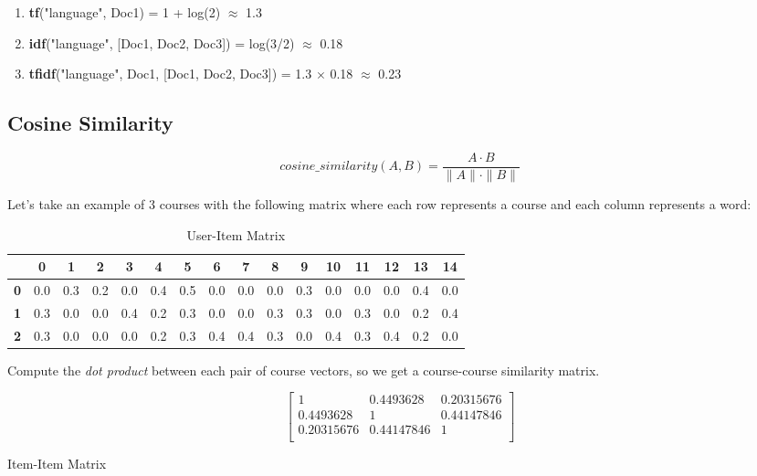 \begin{enumerate}
    \item \textbf{tf}("language", Doc1) = 1 + log(2) $\approx$ 1.3
    \item \textbf{idf}("language", [Doc1, Doc2, Doc3]) = log(3/2) $\approx$ 0.18
    \item \textbf{tfidf}("language", Doc1, [Doc1, Doc2, Doc3]) = 1.3 $\times$ 0.18 $\approx$ 0.23
\end{enumerate}

\subsection{Cosine Similarity}

\begin{equation}
    cosine\_similarity(A, B) = \frac{{A \cdot B}}{{\|A\| \cdot \|B\|}}
\end{equation}

\noindent Let's take an example of 3 courses with the following matrix 
where each row represents a course and each column represents a word:

\begin{table}[H]
\center
\begin{tabular}{|c|c|c|c|c|c|c|c|c|c|c|c|c|c|c|c|}
    \hline
        & \textbf{0} & \textbf{1} & \textbf{2} & \textbf{3} & \textbf{4} & \textbf{5} & \textbf{6} & \textbf{7} & \textbf{8} & \textbf{9} & \textbf{10} & \textbf{11} & \textbf{12} & \textbf{13} & \textbf{14} \\
    \hline
    \textbf{0} & 0.0 & 0.3 & 0.2 & 0.0 & 0.4 & 0.5 & 0.0 & 0.0 & 0.0 & 0.3 & 0.0 & 0.0 & 0.0 & 0.4 & 0.0 \\
    \hline
    \textbf{1} & 0.3 & 0.0 & 0.0 & 0.4 & 0.2 & 0.3 & 0.0 & 0.0 & 0.3 & 0.3 & 0.0 & 0.3 & 0.0 & 0.2 & 0.4 \\
    \hline
    \textbf{2} & 0.3 & 0.0 & 0.0 & 0.0 & 0.2 & 0.3 & 0.4 & 0.4 & 0.3 & 0.0 & 0.4 & 0.3 & 0.4 & 0.2 & 0.0 \\
    \hline
    \end{tabular}
\caption{User-Item Matrix}
\end{table}

\noindent Compute the \textit{dot product} between each pair of course vectors, 
so we get a course-course similarity matrix.

\begin{table}[H]
\[
\begin{bmatrix}
1 & 0.4493628 & 0.20315676 \\
0.4493628 & 1 & 0.44147846 \\
0.20315676 & 0.44147846 & 1 \\
\end{bmatrix}
\]
\caption{Item-Item Matrix}
\end{table}

